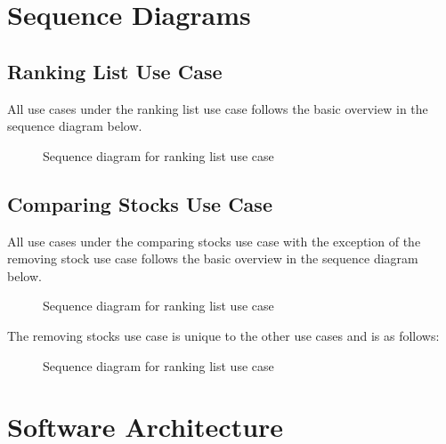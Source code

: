 \documentclass[11pt]{article}
\numberwithin{figure}{section}
\begin{document}
\section{Sequence Diagrams}
    \subsection{Ranking List Use Case}
        All use cases under the ranking list use case follows the basic overview in the sequence diagram below.
        
        \begin{figure}[htp]
                \centering
                \caption{Sequence diagram for ranking list use case}
                \label{fig:rankingListSequence}
        \end{figure}
    
    \subsection{Comparing Stocks Use Case}
        All use cases under the comparing stocks use case with the exception of the removing stock use case follows the basic overview in the sequence diagram below.
        
        \begin{figure}[htp]
                \centering
                \caption{Sequence diagram for ranking list use case}
                \label{fig:rankingListSequence}
        \end{figure}
        
        The removing stocks use case is unique to the other use cases and is as follows:
        
        \begin{figure}[htp]
                \centering
                \caption{Sequence diagram for ranking list use case}
                \label{fig:rankingListSequence}
        \end{figure}
        
\section{Software Architecture}
\end{document}
